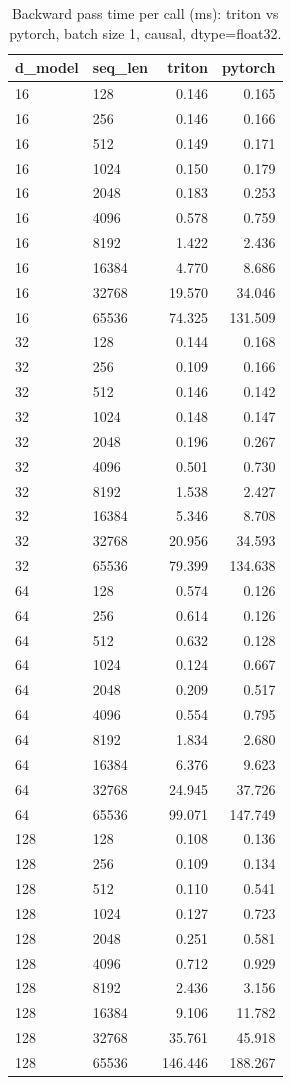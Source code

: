 \begin{table}
\centering
\begin{tabular}{llrr}
\toprule
d\_model & seq\_len & triton & pytorch \\
\midrule
16 & 128 & 0.146 & 0.165 \\
16 & 256 & 0.146 & 0.166 \\
16 & 512 & 0.149 & 0.171 \\
16 & 1024 & 0.150 & 0.179 \\
16 & 2048 & 0.183 & 0.253 \\
16 & 4096 & 0.578 & 0.759 \\
16 & 8192 & 1.422 & 2.436 \\
16 & 16384 & 4.770 & 8.686 \\
16 & 32768 & 19.570 & 34.046 \\
16 & 65536 & 74.325 & 131.509 \\
32 & 128 & 0.144 & 0.168 \\
32 & 256 & 0.109 & 0.166 \\
32 & 512 & 0.146 & 0.142 \\
32 & 1024 & 0.148 & 0.147 \\
32 & 2048 & 0.196 & 0.267 \\
32 & 4096 & 0.501 & 0.730 \\
32 & 8192 & 1.538 & 2.427 \\
32 & 16384 & 5.346 & 8.708 \\
32 & 32768 & 20.956 & 34.593 \\
32 & 65536 & 79.399 & 134.638 \\
64 & 128 & 0.574 & 0.126 \\
64 & 256 & 0.614 & 0.126 \\
64 & 512 & 0.632 & 0.128 \\
64 & 1024 & 0.124 & 0.667 \\
64 & 2048 & 0.209 & 0.517 \\
64 & 4096 & 0.554 & 0.795 \\
64 & 8192 & 1.834 & 2.680 \\
64 & 16384 & 6.376 & 9.623 \\
64 & 32768 & 24.945 & 37.726 \\
64 & 65536 & 99.071 & 147.749 \\
128 & 128 & 0.108 & 0.136 \\
128 & 256 & 0.109 & 0.134 \\
128 & 512 & 0.110 & 0.541 \\
128 & 1024 & 0.127 & 0.723 \\
128 & 2048 & 0.251 & 0.581 \\
128 & 4096 & 0.712 & 0.929 \\
128 & 8192 & 2.436 & 3.156 \\
128 & 16384 & 9.106 & 11.782 \\
128 & 32768 & 35.761 & 45.918 \\
128 & 65536 & 146.446 & 188.267 \\
\bottomrule
\end{tabular}
\caption{Backward pass time per call (ms): triton vs pytorch, batch size 1, causal, dtype=float32.}
\label{tab:flash_backward_compare_float32}
\end{table}
